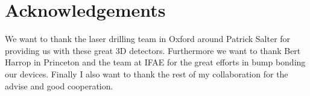 \section*{Acknowledgements} 
We want to thank the laser drilling team in Oxford around Patrick Salter for providing us with these great 3D detectors. Furthermore we want to thank Bert Harrop in Princeton and the team at IFAE for the great efforts in bump bonding our devices. Finally I also want to thank the rest of my collaboration for the advise and good cooperation.

